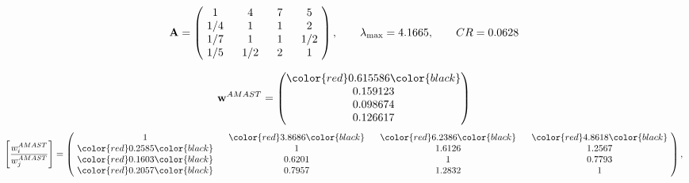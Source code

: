 \begin{example}
\begin{equation*}
\mathbf{A} =
\begin{pmatrix}
$\,\,$ 1 $\,\,$ & $\,\,$4$\,\,$ & $\,\,$7$\,\,$ & $\,\,$5 $\,\,$ \\
$\,\,$ 1/4$\,\,$ & $\,\,$ 1 $\,\,$ & $\,\,$1$\,\,$ & $\,\,$2 $\,\,$ \\
$\,\,$ 1/7$\,\,$ & $\,\,$ 1 $\,\,$ & $\,\,$ 1 $\,\,$ & $\,\,$ 1/2 $\,\,$ \\
$\,\,$ 1/5$\,\,$ & $\,\,$ 1/2$\,\,$ & $\,\,$2$\,\,$ & $\,\,$ 1  $\,\,$ \\
\end{pmatrix},
\qquad
\lambda_{\max} =
4.1665,
\qquad
CR = 0.0628
\end{equation*}

\begin{equation*}
\mathbf{w}^{AMAST} =
\begin{pmatrix}
\color{red} 0.615586\color{black} \\
0.159123\\
0.098674\\
0.126617
\end{pmatrix}\end{equation*}
\begin{equation*}
\left[ \frac{{w}^{AMAST}_i}{{w}^{AMAST}_j} \right] =
\begin{pmatrix}
$\,\,$ 1 $\,\,$ & $\,\,$\color{red} 3.8686\color{black} $\,\,$ & $\,\,$\color{red} 6.2386\color{black} $\,\,$ & $\,\,$\color{red} 4.8618\color{black} $\,\,$ \\
$\,\,$\color{red} 0.2585\color{black} $\,\,$ & $\,\,$ 1 $\,\,$ & $\,\,$1.6126$\,\,$ & $\,\,$1.2567  $\,\,$ \\
$\,\,$\color{red} 0.1603\color{black} $\,\,$ & $\,\,$0.6201$\,\,$ & $\,\,$ 1 $\,\,$ & $\,\,$0.7793 $\,\,$ \\
$\,\,$\color{red} 0.2057\color{black} $\,\,$ & $\,\,$0.7957$\,\,$ & $\,\,$1.2832$\,\,$ & $\,\,$ 1  $\,\,$ \\
\end{pmatrix},
\end{equation*}


\end{example}
